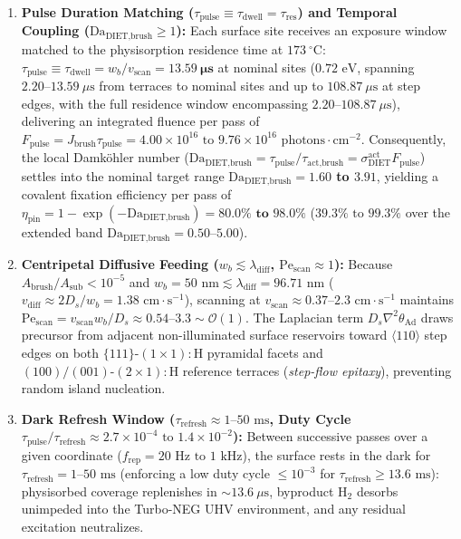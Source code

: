 \documentclass[10pt,twocolumn,a4paper]{article}
\begin{document}
\begin{enumerate}
    \item \textbf{Pulse Duration Matching ($\tau_{\text{pulse}} \equiv \tau_{\text{dwell}} = \tau_{\text{res}}$) and Temporal Coupling ($\text{Da}_{\text{DIET,brush}} \ge 1$):} Each surface site receives an exposure window matched to the physisorption residence time at $173\ ^\circ\text{C}$: $\tau_{\text{pulse}} \equiv \tau_{\text{dwell}} = w_b / v_{\text{scan}} = \mathbf{13.59\ \mu\text{s}}$ at nominal sites ($0.72\text{ eV}$, spanning $2.20\text{--}13.59\ \mu\text{s}$ from terraces to nominal sites and up to $108.87\ \mu\text{s}$ at step edges, with the full residence window encompassing $2.20\text{--}108.87\ \mu\text{s}$), delivering an integrated fluence per pass of $F_{\text{pulse}} = J_{\text{brush}}\tau_{\text{pulse}} = 4.00 \times 10^{16}\text{ to }9.76 \times 10^{16}\text{ photons}\cdot\text{cm}^{-2}$. Consequently, the local Damköhler number ($\text{Da}_{\text{DIET,brush}} = \tau_{\text{pulse}}/\tau_{\text{act,brush}} = \sigma_{\text{DIET}}^{\text{act}} F_{\text{pulse}}$) settles into the nominal target range \textbf{$\text{Da}_{\text{DIET,brush}} = 1.60$ to $3.91$}, yielding a covalent fixation efficiency per pass of $\eta_{\text{pin}} = 1 - \exp(-\text{Da}_{\text{DIET,brush}}) = \mathbf{80.0\%\text{ to }98.0\%}$ ($39.3\%\text{ to }99.3\%$ over the extended band $\text{Da}_{\text{DIET,brush}} = 0.50\text{--}5.00$).
    \item \textbf{Centripetal Diffusive Feeding ($w_b \lesssim \lambda_{\text{diff}}$, $\text{Pe}_{\text{scan}} \approx 1$):} Because $A_{\text{brush}}/A_{\text{sub}} < 10^{-5}$ and $w_b = 50\text{ nm} \lesssim \lambda_{\text{diff}} = 96.71\text{ nm}$ ($v_{\text{diff}} \approx 2 D_s / w_b = 1.38\text{ cm}\cdot\text{s}^{-1}$), scanning at $v_{\text{scan}} \approx 0.37\text{--}2.3\text{ cm}\cdot\text{s}^{-1}$ maintains \textbf{$\text{Pe}_{\text{scan}} = v_{\text{scan}} w_b / D_s \approx 0.54\text{--}3.3 \sim \mathcal{O}(1)$}. The Laplacian term $D_s \nabla^2 \theta_{\text{Ad}}$ draws precursor from adjacent non-illuminated surface reservoirs toward $\langle 110 \rangle$ step edges on both $\{111\}\text{-}(1\times 1):\text{H}$ pyramidal facets and $(100)/(001)\text{-}(2\times 1):\text{H}$ reference terraces (\textit{step-flow epitaxy}), preventing random island nucleation.
    \item \textbf{Dark Refresh Window ($\tau_{\text{refresh}} \approx 1\text{--}50\text{ ms}$, Duty Cycle $\tau_{\text{pulse}}/\tau_{\text{refresh}} \approx 2.7 \times 10^{-4}\text{ to }1.4 \times 10^{-2}$):} Between successive passes over a given coordinate ($f_{\text{rep}} = 20\text{ Hz to }1\text{ kHz}$), the surface rests in the dark for $\tau_{\text{refresh}} = 1\text{--}50\text{ ms}$ (enforcing a low duty cycle $\le 10^{-3}$ for $\tau_{\text{refresh}} \ge 13.6\text{ ms}$): physisorbed coverage replenishes in $\sim 13.6\ \mu\text{s}$, byproduct $\text{H}_2$ desorbs unimpeded into the Turbo-NEG UHV environment, and any residual excitation neutralizes.
\end{enumerate}
\end{document}

